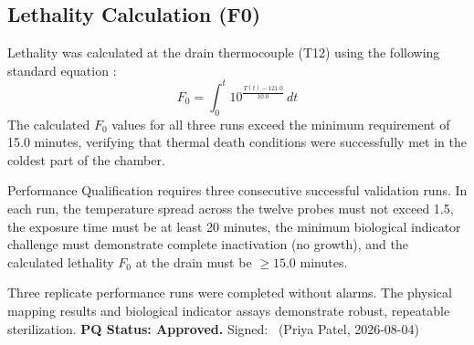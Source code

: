 \subsection{Lethality Calculation (F0)}
Lethality was calculated at the drain thermocouple (T12) using the following standard equation \citep{en285}:
\begin{equation}
F_0 = \int_{0}^{t} 10^{\frac{T(t) - 121.0}{10.0}} \, dt
\end{equation}
The calculated \(F_0\) values for all three runs exceed the minimum requirement of 15.0 minutes, verifying that thermal death conditions were successfully met in the coldest part of the chamber.

\begin{acceptancebox}
Performance Qualification requires three consecutive successful validation runs. In each run, the temperature spread across the twelve probes must not exceed 1.5\degC, the exposure time must be at least 20 minutes, the minimum biological indicator challenge must demonstrate complete inactivation (no growth), and the calculated lethality \(F_0\) at the drain must be \(\ge 15.0\) minutes.
\end{acceptancebox}

\begin{verdictbox}
Three replicate performance runs were completed without alarms. The physical mapping results and biological indicator assays demonstrate robust, repeatable sterilization.
\textbf{PQ Status: Approved.} Signed: \makebox[3.0cm]{\hrulefill}\ (Priya Patel, 2026-08-04)
\end{verdictbox}
